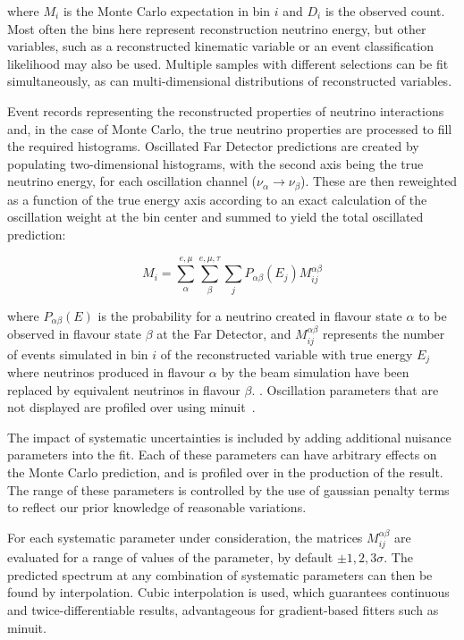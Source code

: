 where $M_i$ is the Monte Carlo expectation in bin $i$ and $D_i$ is the observed count. Most often the bins here represent reconstruction neutrino energy, but other variables, such as a reconstructed kinematic variable or an event classification likelihood may also be used. Multiple samples with different selections can be fit simultaneously, as can multi-dimensional distributions of reconstructed variables.

Event records representing the reconstructed properties of neutrino interactions and, in the case of Monte Carlo, the true neutrino properties are processed to fill the required histograms. Oscillated Far Detector predictions are created by populating two-dimensional histograms, with the second axis being the true neutrino energy, for each oscillation channel ($\nu_\alpha\to\nu_\beta$). These are then reweighted as a function of the true energy axis according to an exact calculation of the oscillation weight at the bin center %
 and summed to yield the total oscillated prediction:

\begin{equation}
    M_i = \sum_\alpha^{e,\mu}\sum_\beta^{e,\mu,\tau}\sum_j P_{\alpha\beta}(E_j)M_{ij}^{\alpha\beta}
    \label{eqn:cafana_ll}
\end{equation}

where $P_{\alpha\beta}(E)$ is the probability for a neutrino created in flavour state $\alpha$ to be observed in flavour state $\beta$ at the Far Detector, and $M_{ij}^{\alpha\beta}$ represents the number of events simulated in bin $i$ of the reconstructed variable with true energy $E_j$ where neutrinos produced in flavour $\alpha$ by the beam simulation have been replaced by equivalent neutrinos in flavour $\beta$. . Oscillation parameters that are not displayed are profiled over using {\sc minuit}~\cite{minuit}.%


The impact of systematic uncertainties is included by adding additional nuisance parameters into the fit. Each of these parameters can have arbitrary effects on the Monte Carlo prediction, and is profiled over in the production of the result. The range of these parameters is controlled by the use of gaussian penalty terms to reflect our prior knowledge of reasonable variations.

For each systematic parameter under consideration, the matrices $M_{ij}^{\alpha\beta}$ are evaluated for a range of values of the parameter, by default $\pm1,2,3\sigma$. The predicted spectrum at any combination of systematic parameters can then be found by interpolation. Cubic interpolation is used, which guarantees continuous and twice-differentiable results, advantageous for gradient-based fitters such as {\sc minuit}. %

